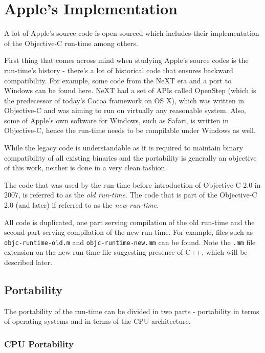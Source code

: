\chapter{Apple's Implementation}

A lot of Apple's source code is open-sourced\cite{apple_open_source} which includes their implementation of the Objective-C run-time among others.

First thing that comes across mind when studying Apple's source codes is the run-time's history - there's a lot of historical code that ensures backward compatibility. For example, some code from the NeXT era and a port to Windows can be found here. NeXT had a set of APIs called OpenStep (which is the predecessor of today's Cocoa framework on OS X), which was written in Objective-C and was aiming to run on virtually any reasonable system\cite{openstep_wiki}. Also, some of Apple's own software for Windows, such as Safari, is written in Objective-C, hence the run-time needs to be compilable under Windows as well\cite{safari_windows}.

While the legacy code is understandable as it is required to maintain binary compatibility of all existing binaries and the portability is generally an objective of this work, neither is done in a very clean fashion.

The code that was used by the run-time before introduction of Objective-C 2.0 in 2007, is referred to as the \emph{old run-time}. The code that is part of the Objective-C 2.0 (and later) if referred to as the \emph{new run-time}.

All code is duplicated, one part serving compilation of the old run-time and the second part serving compilation of the new run-time. For example, files such as \verb=objc-runtime-old.m= and \verb=objc-runtime-new.mm= can be found. Note the \verb=.mm= file extension on the new run-time file suggesting presence of C++, which will be described later.

\section{Portability}

The portability of the run-time can be divided in two parts - portability in terms of operating systems and in terms of the CPU architecture.

\subsection{CPU Portability}

